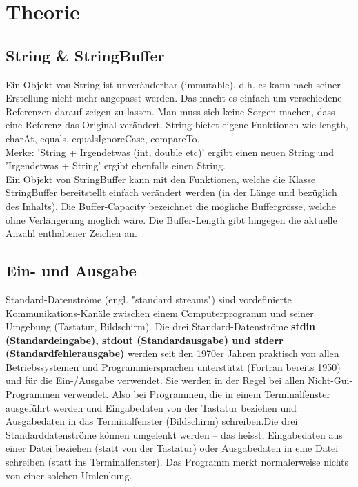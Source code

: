 \newpage

\section{Theorie}
\subsection{String \& StringBuffer}
Ein Objekt von String ist unveränderbar (immutable), d.h. es kann nach seiner Erstellung nicht mehr angepasst werden. Das macht es einfach um verschiedene Referenzen darauf zeigen zu lassen. Man muss sich keine Sorgen machen, dass eine Referenz das Original verändert. String bietet eigene Funktionen wie length, charAt, equals, equalsIgnoreCase, compareTo. \\ 
Merke: 'String + Irgendetwas (int, double etc)' ergibt einen neuen String und 'Irgendetwas + String' ergibt ebenfalls einen String. \\
Ein Objekt von StringBuffer kann mit den Funktionen, welche die Klasse StringBuffer bereitstellt einfach verändert werden (in der Länge und bezüglich des Inhalts). Die Buffer-Capacity bezeichnet die mögliche Buffergrösse, welche ohne Verlängerung möglich wäre. Die Buffer-Length gibt hingegen die aktuelle Anzahl enthaltener Zeichen an.  
\newline



\subsection{Ein- und Ausgabe}
Standard-Datenströme (engl. "standard streams")
sind vordefinierte Kommunikations-Kanäle zwischen
einem Computerprogramm und seiner Umgebung 
(Tastatur, Bildschirm). Die drei Standard-Datenströme \textbf{stdin (Standardeingabe), stdout (Standardausgabe) und stderr (Standardfehlerausgabe)} werden seit den 1970er Jahren praktisch von allen Betriebssystemen und Programmiersprachen unterstützt (Fortran bereits 1950) und für die Ein-/Ausgabe verwendet. Sie werden in der Regel bei allen Nicht-Gui-Programmen verwendet. Also bei Programmen, die in einem Terminalfenster ausgeführt werden und Eingabedaten von der Tastatur beziehen und Ausgabedaten in das Terminalfenster (Bildschirm) schreiben.Die drei Standarddatenströme können umgelenkt werden – das heisst, Eingabedaten aus einer Datei beziehen (statt von der Tastatur) oder Ausgabedaten in eine Datei schreiben (statt ins Terminalfenster). Das Programm merkt normalerweise nichts von einer solchen Umlenkung.

